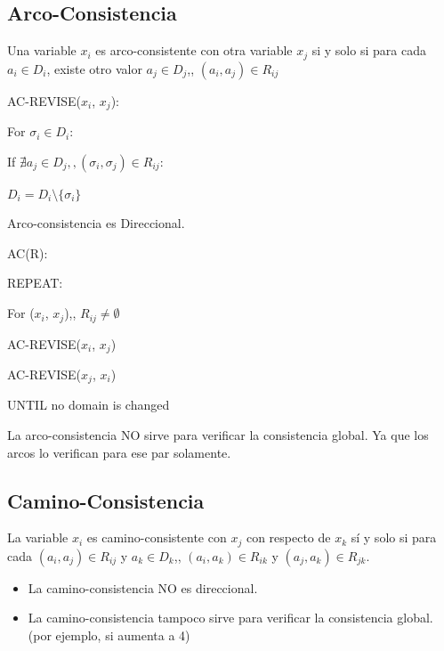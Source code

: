 \documentclass[12pt, twoside, openright]{report} %
\begin{document}
\subsection{Arco-Consistencia}

Una variable \(x_i\) es arco-consistente con otra variable \(x_j\) si
y solo si para cada \(a_i \in D_i\), existe otro valor
\(a_j \in D_j\),, \((a_i,a_j) \in R_{ij}\)

AC-REVISE($x_i$, $x_j$):

\hspace{0.6cm} For $\sigma_i \in D_i$:

\hspace{1.2cm} If $\nexists a_j \in D_j ,, (\sigma_i, \sigma_j) \in R_{ij}$:

\hspace{1.8cm} $D_i = D_i \setminus \{ \sigma_i \}$

Arco-consistencia es Direccional.

AC(R):

\hspace{0.6cm} REPEAT:

\hspace{1.2cm} For ($x_i$, $x_j$),, $R_{ij} \neq \emptyset$

\hspace{1.8cm} AC-REVISE($x_i$, $x_j$)

\hspace{1.8cm} AC-REVISE($x_j$, $x_i$)

\hspace{0.6cm} UNTIL no domain is changed

La arco-consistencia NO sirve para verificar la consistencia global.
Ya que los arcos lo verifican para ese par solamente.



\subsection{Camino-Consistencia}


La variable \(x_i\) es camino-consistente con \(x_j\) con respecto
de \(x_k\) sí y solo si para cada \((a_i,a_j) \in R_{ij}\) y
\(a_k \in D_k\),, \((a_i,a_k) \in R_{ik}\) y
\((a_j,a_k) \in R_{jk}\).

\begin{itemize}
	\item La camino-consistencia NO es direccional.
	\item La camino-consistencia tampoco sirve para verificar la
	      consistencia global. (por ejemplo, si aumenta a 4)

\end{itemize}
\pagebreak
\end{document}
